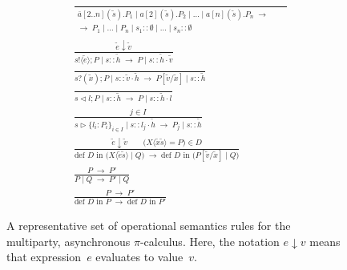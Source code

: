 \documentclass[a4paper,12pt,oneside,fleqn]{book} %
\begin{document}
\begin{figure} %
\begin{align}
  &\frac
    {}
    {\begin{aligned}
      \bar{a}[2..n](\tilde{s}).P_1
    \mid a[2](\tilde{s}).P_2
    \mid \ldots
    \mid a[n](\tilde{s}).P_n
    \;\to\qquad\\ \to\;
    P_1 \mid\ldots\mid P_n
    \mid s_1::\emptyset \mid\ldots\mid s_n::\emptyset
    \end{aligned}}
    \label{eq:mast-opsem-link}
\\[1ex]
  &\frac
    {\tilde{e}\mathrel{\downarrow}\tilde{v}}
    {s!\langle\tilde{e}\rangle;P \mid s :: \tilde{h}
    \;\to\;
    P \mid s :: \tilde{h}\cdot\tilde{v}}
    \label{eq:mast-opsem-send}
\\[1ex]
  &\frac
    {}
    {s?(\tilde{x});P \mid s :: \tilde{v}\cdot \tilde{h}
    \;\to\;
    P[\tilde{v}/\tilde{x}] \mid s :: \tilde{h}}
    \label{eq:mast-opsem-recv}
\\[1ex]
  &\frac
    {}
    {s \triangleleft l;P \mid s :: \tilde{h}
    \;\to\;
    P \mid s :: \tilde{h}\cdot l}
    \label{eq:mast-opsem-label}
\\[1ex]
  &\frac
    {j \in I}
    {s \triangleright \{l_i : P_i\}_{i\in I} \mid s :: l_j \cdot \tilde{h}
    \;\to\;
    P_j \mid s :: \tilde{h}}
    \label{eq:mast-opsem-branch}
\\[1ex]
  &\frac
    {\tilde{e}\mathrel{\downarrow}\tilde{v}
      \qquad \bigl(X\langle\tilde{x}\tilde{s}\rangle=P\bigr) \in D}
    {\text{def $D$ in $\bigl(X\langle\tilde{e}\tilde{s}\rangle\mid Q\bigr)$}
    \;\to\;
    \text{def $D$ in $\bigl(P[\tilde{v}/\tilde{x}]\mid Q\bigr)$}}
    \label{eq:mast-opsem-def}
\\[1ex]
  &\frac
    {P \;\to\; P'}
    {P\mid Q \;\to\; P'\mid Q}
    \label{eq:mast-opsem-par}
\\[1ex]
  &\frac
    {P \;\to\; P'}
    {\text{def $D$ in $P$} \;\to\; \text{def $D$ in $P'$}}
    \label{eq:mast-opsem-defin}
\end{align}
\caption{
  A representative set of operational semantics rules
    for the multiparty, asynchronous $\pi$-calculus.
  Here, the notation $e\downarrow v$ means
    that expression~$e$ evaluates to value~$v$.
}
\label{fig:pi-opsem}
\end{figure}
\end{document}
